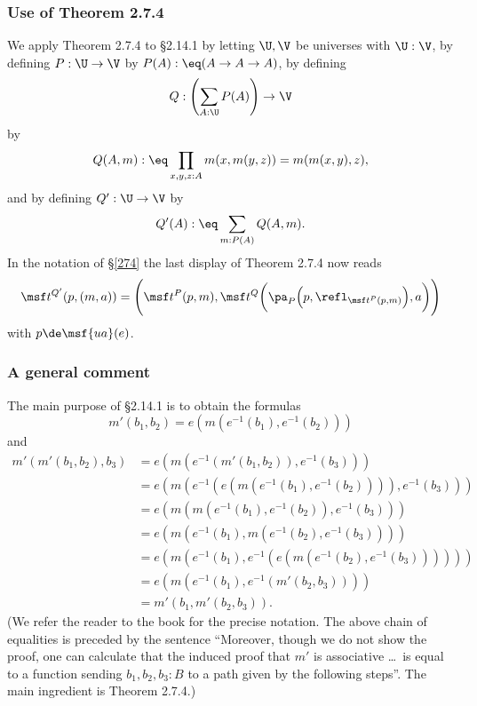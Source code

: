 \documentclass[12pt]{article}
\begin{document}
\subsubsection{Use of Theorem 2.7.4}

We apply Theorem 2.7.4 to \S2.14.1 by letting $\U,\V$ be universes with $\U:\V$, by defining $P:\U\to\V$ by $P(A):\eq(A\to A\to A)$, by defining 
$$
Q:\left(\sum_{A:\U}P(A)\right)\to\V
$$ 
by 
$$
Q(A,m):\eq\prod_{x,y,z:A}m(x,m(y,z))=m(m(x,y),z),
$$ 
and by defining $Q':\U\to\V$ by 
$$ 
Q'(A):\eq\sum_{m:P(A)}Q(A,m).
$$
In the notation of \S\ref{274} the last display of Theorem 2.7.4 now reads 
$$
\msf t^{Q'}(p,(m,a))=\Bigg(\msf t^P(p,m),\msf t^Q\bigg(\pa_P\Big(p,\refl_{\msf t^P(p,m)}\Big),a\bigg)\Bigg)
$$ 
with $p\de\msf{ua}(e)$.

\subsubsection{A general comment}

The main purpose of \S2.14.1 is to obtain the formulas
$$
m'(b_1,b_2)=e(m(e^{-1}(b_1),e^{-1}(b_2)))
$$ 
and
\begin{equation*}
  \begin{aligned}
    m'(m'(b_1,b_2),b_3)
    &= e(m(e^{-1}(m'(b_1,b_2)),e^{-1}(b_3))) \\
    &= e(m(e^{-1}(e(m(e^{-1}(b_1),e^{-1}(b_2)))),e^{-1}(b_3))) \\
    &= e(m(m(e^{-1}(b_1),e^{-1}(b_2)),e^{-1}(b_3))) \\
    &= e(m(e^{-1}(b_1),m(e^{-1}(b_2),e^{-1}(b_3)))) \\
    &= e(m(e^{-1}(b_1),e^{-1}(e(m(e^{-1}(b_2),e^{-1}(b_3)))))) \\
    &= e(m(e^{-1}(b_1),e^{-1}(m'(b_2,b_3)))) \\
    &= m'(b_1,m'(b_2,b_3)).
\end{aligned}
\end{equation*}
(We refer the reader to the book for the precise notation. The above chain of equalities is preceded by the sentence ``Moreover, though we do not show the proof, one can calculate that the induced proof that $m'$ is associative \dots\ is equal to a function sending $b_1,b_2,b_3:B$ to a path given by the following steps''. The main ingredient is Theorem 2.7.4.)
\end{document}
